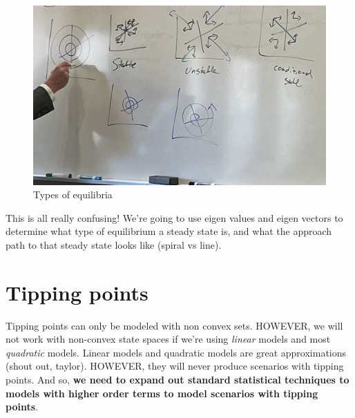 \documentclass{article}
\begin{document}
\begin{figure}[htp]
    \centering
    \includegraphics[width=0.5\linewidth]{Screen Shot 2023-11-15 at 11.38.59 AM.png}
    \caption{Types of equilibria}
    \label{fig:enter-label}
\end{figure}

This is all really confusing! We're going to use eigen values and eigen vectors to determine what type of equilibrium a steady state is, and what the approach path to that steady state looks like (spiral vs line). 


\section{Tipping points}

Tipping points can only be modeled with non convex sets. HOWEVER, we will not work with non-convex state spaces if we're using \textit{linear} models and most \textit{quadratic} models. Linear models and quadratic models are great approximations (shout out, taylor). HOWEVER, they will never produce scenarios with tipping points. And so, \textbf{we need to expand out standard statistical techniques to models with higher order terms to model scenarios with tipping points}. 
\end{document}
